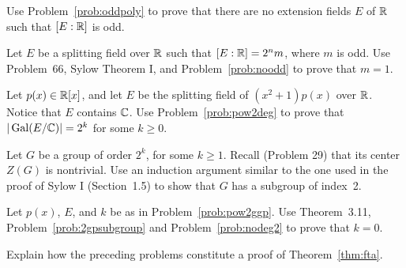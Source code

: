 \begin{problem}\label{prob:noodd}
    Use Problem~\ref{prob:oddpoly} to prove that there are no extension fields $E$ of $\mathbb{R}$ such that $[E:\mathbb{R}]$ is odd.
\end{problem}





\begin{problem}\label{prob:pow2deg}
    Let $E$ be a splitting field over $\mathbb{R}$ such that $[E:\mathbb{R}] = 2^n m$, where $m$ is odd. Use Problem~66, Sylow Theorem I, and Problem~\ref{prob:noodd} to prove that $m=1$.
\end{problem}



\begin{problem}\label{prob:pow2ggp}
    Let $p(x) \in \mathbb{R}[x]$, and let $E$ be the splitting field of $(x^2+1)p(x)$ over $\mathbb{R}$. Notice that $E$ contains $\mathbb{C}$. Use Problem~\ref{prob:pow2deg} to prove that $|\operatorname{Gal}(E/\mathbb{C})| = 2^k$ for some $k \geq 0$.
\end{problem}



\begin{problem}\label{prob:2gpsubgroup}
    Let $G$ be a group of order $2^k$, for some $k\geq 1$. Recall (Problem 29) that its center $Z(G)$ is nontrivial. Use an induction argument similar to the one used in the proof of Sylow I (Section~1.5) to show that $G$ has a subgroup of index~2.
\end{problem}



\begin{problem}
    Let $p(x)$, $E$, and $k$ be as in Problem~\ref{prob:pow2ggp}. Use Theorem~3.11, Problem~\ref{prob:2gpsubgroup} and Problem~\ref{prob:nodeg2} to prove that $k=0$.
\end{problem}



\begin{problem}
    Explain how the preceding problems constitute a proof of Theorem~\ref{thm:fta}.
\end{problem}


\backmatter

